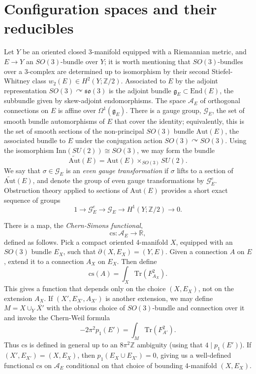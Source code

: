 \documentclass{memo-l}
\theoremstyle{definition}
\theoremstyle{remark}
\numberwithin{section}{chapter}
\numberwithin{equation}{chapter}
\begin{document}
\chapter{Configuration spaces and their reducibles}\label{chap:2}
Let $Y$ be an oriented closed 3-manifold equipped with a Riemannian metric, and $E \to Y$ an $SO(3)$-bundle over $Y$; it is worth mentioning that $SO(3)$-bundles over a 3-complex are determined up to isomorphism by their second Stiefel-Whitney class $w_2(E) \in H^2(Y;\mathbb Z/2)$. Associated to $E$ by the adjoint representation $SO(3) \curvearrowright \mathfrak{so}(3)$ is the adjoint bundle $\mathfrak g_E \subset \text{End}(E)$, the subbundle given by skew-adjoint endomorphisms. The space $\mathcal A_E$ of orthogonal connections on $E$ is affine over $\Omega^1(\mathfrak g_E)$. There is a gauge group, $\mathcal G_E$, the set of smooth bundle automorphisms of $E$ that cover the identity; equivalently, this is the set of smooth sections of the non-principal $SO(3)$ bundle $\text{Aut}(E)$, the associated bundle to $E$ under the conjugation action $SO(3) \curvearrowright SO(3)$. Using the isomorphism $\text{Inn}(SU(2)) \cong SO(3)$, we may form the bundle $$\widetilde{\text{Aut}}(E) = \text{Aut}(E) \times_{SO(3)} SU(2).$$ We say that $\sigma \in \mathcal G_E$ is an \textit{even gauge transformation} if $\sigma$ lifts to a section of $\widetilde{\text{Aut}}(E)$, and denote the group of even gauge transformations by $\mathcal G^e_E$. Obstruction theory applied to sections of $\text{Aut}(E)$ provides a short exact sequence of groups $$1 \to \mathcal G^e_E \to \mathcal G_E \to H^1(Y;\mathbb Z/2) \to 0.$$

There is a map, the \textit{Chern-Simons functional}, $$\text{cs}: \mathcal A_E \to \mathbb R,$$ defined as follows. Pick a compact oriented 4-manifold $X$, equipped with an $SO(3)$ bundle $E_X$, such that $\partial(X,E_X) = (Y,E)$. Given a connection $A$ on $E$, extend it to a connection $A_X$ on $E_X$. Then define $$\text{cs}(A) = \int_X \text{Tr}(F_{A_X}^2).$$ This gives a function that depends only on the choice $(X,E_X)$, not on the extension $A_X$. If $(X',E_{X'},A_{X'})$ is another extension, we may define $M = X \cup_Y \overline{X'}$ with the obvious choice of $SO(3)$-bundle and connection over it and invoke the Chern-Weil formula $$-2 \pi^2 p_1(E') = \int_M \text{Tr}(F_{A'}^2).$$ Thus $\text{cs}$ is defined in general up to an $8\pi^2 \mathbb Z$ ambiguity (using that $4 \mid p_1(E')$). If $(X', E_{X'}) = (X, E_X)$, then $p_1(E_X \cup E_{X'}) = 0$, giving us a well-defined functional $\text{cs}$ on $\mathcal A_E$ conditional on that choice of bounding 4-manifold $(X, E_X)$.
\end{document}
